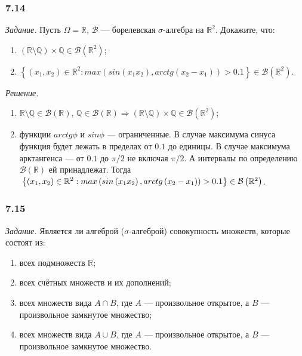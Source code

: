 \subsubsection*{7.14}

\textit{Задание.} Пусть $ \Omega = \mathbb{R}, \, \mathcal{B} $ --- борелевская $ \sigma $-алгебра на $ \mathbb{R}^2$.
Докажите, что:
\begin{enumerate}[label=\alph*)]
\item $ \left( \mathbb{R} \setminus \mathbb{Q} \right) \times \mathbb{Q} \in \mathcal{B} \left( \mathbb{R}^2 \right) $;
\item $ \left\{ \left( x_1, x_2 \right) \in \mathbb{R}^2:
max \left( sin \left( x_1 x_2 \right), arctg \left( x_2 - x_1 \right) \right) > 0.1 \right\} \in \mathcal{B} \left( \mathbb{R}^2 \right) $.
\end{enumerate}

\textit{Решение.}
\begin{enumerate}[label=\alph*)]
\item $ \mathbb{R} \setminus \mathbb{Q} \in \mathcal{B} \left( \mathbb{R} \right), \,
\mathbb{Q} \in \mathcal{B} \left( \mathbb{R} \right) \Rightarrow
\left( \mathbb{R} \setminus \mathbb{Q} \right) \times \mathbb{Q} \in \mathcal{B} \left( \mathbb{R}^2 \right) $;
\item функции $arctg \phi $ и $sin \phi $ --- ограниченные.
В случае максимума синуса функция будет лежать в пределах от $0.1$ до единицы.
В случае максимума арктангенса --- от $0.1$ до $ \pi/2$ не включая $ \pi/2$.
А интервалы по определению $ \mathcal{B} \left( \mathbb{R} \right) $ ей принадлежат.
Тогда $ \\
\left\{ \left( x_1, x_2 \right) \in \mathbb{R}^2:
max \left( sin \left( x_1 x_2 \right), arctg \left( x_2 - x_1 \right) \right) > 0.1 \right\} \in \mathcal{B} \left( \mathbb{R}^2 \right) $.
\end{enumerate}

\subsubsection*{7.15}

\textit{Задание.} Является ли алгеброй ($ \sigma $-алгеброй) совокупность множеств, которые состоят из:
\begin{enumerate}[label=\alph*)]
\item всех подмножеств $ \mathbb{R} $;
\item всех счётных множеств и их дополнений;
\item всех множеств вида $A \cap B$, где $A$ --- произвольное открытое, а $B$ --- произвольное замкнутое множество;
\item всех множеств вида $A \cup B$, где $A$ --- произвольное открытое, а $B$ --- произвольное замкнутое множество.
\end{enumerate}

